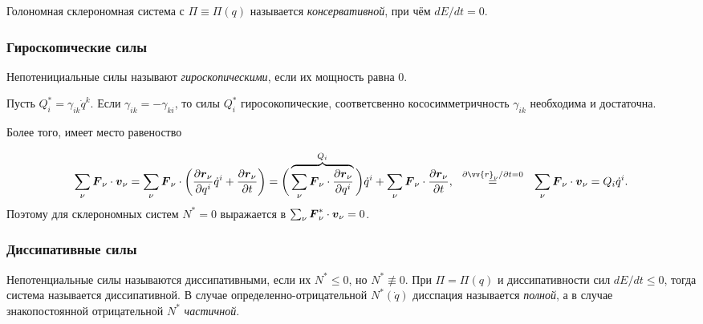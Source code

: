 \begin{to_def} 
    Голономная склерономная система с  $\Pi \equiv \Pi(q)$ называется \textit{консервативной}, при чём $d E / d t = 0$.
\end{to_def}

\subsubsection*{Гироскопические силы}


\begin{to_def} 
    Непотенициальные силы называют \textit{гироскопическими}, если их мощность равна $0$. 
\end{to_def}


Пусть $Q^*_i = \gamma_{ik} \dot{q}^k$. Если $\gamma_{ik} = -\gamma_{ki}$, то силы $Q^*_i$ гиросокопические, соответсвенно кососимметричность $\gamma_{ik}$ необходима и достаточна.

Более того, имеет место равеноство

\vspace{-25pt}
\begin{equation*}
    \sum_\nu \vc{F}_\nu \cdot \vc{v}_\nu = \sum_\nu \vc{F}_\nu \cdot
    \left(
        \frac{\partial \vc{r}_\nu}{\partial q^i} \dot{q}^i + \frac{\partial \vc{r}_\nu}{\partial t} 
    \right) 
    =
     \bigg(
     \overbrace{
     \sum_\nu \vc{F}_\nu \cdot \frac{\partial \vc{r}_\nu}{\partial q^i}
     }^{
     Q_i
     }
      \bigg)
     \dot{q}^i + \sum_\nu \vc{F}_\nu \cdot \frac{\partial \vc{r}_\nu}{\partial t},
     \hspace{0.25cm} \overset{\partial \vv{r}_\nu / \partial t = 0}{=}  \hspace{0.25cm} 
     \sum_\nu \vc{F}_\nu \cdot \vc{v}_\nu = Q_i \dot{q}^i.
\end{equation*}
Поэтому для склерономных систем $N^* = 0$ выражается в $\sum_\nu \mbox{\boldmath $F$}_\nu^* \cdot \mbox{\boldmath $v$}_\nu = 0$.

\subsubsection*{Диссипативные силы}

\begin{to_def} 
    Непотенциальные силы называются диссипативными, если их $N^* \leq 0$, но $N^* \not \equiv 0$. При $\Pi = \Pi(q)$ и диссипативности сил $d E / dt \leq 0$, тогда система называется диссипативной. В случае определенно-отрицательной $N^* (\dot{q})$ дисспация называется \textit{полной}, а в случае знакопостоянной отрицательной $N^*$ \textit{частичной}.
\end{to_def}

